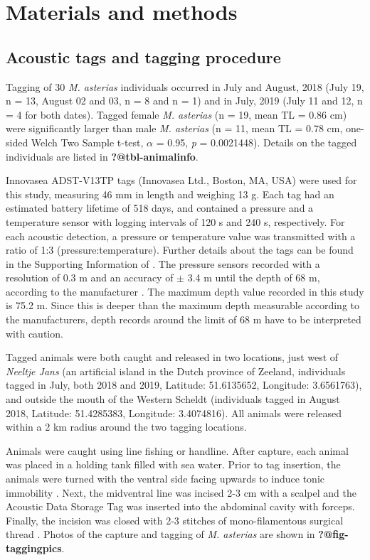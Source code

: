 \documentclass[
  authoryear,
  review,
  3p]{elsarticle}
\begin{document}
\hypertarget{sec-mm}{%
\section{Materials and methods}\label{sec-mm}}

\hypertarget{acoustic-tags-and-tagging-procedure}{%
\subsection{Acoustic tags and tagging
procedure}\label{acoustic-tags-and-tagging-procedure}}

Tagging of 30 \emph{M. asterias} individuals occurred in July and
August, 2018 (July 19, n = 13, August 02 and 03, n = 8 and n = 1) and in
July, 2019 (July 11 and 12, n = 4 for both dates). Tagged female
\emph{M. asterias} (n = 19, mean TL = 0.86 cm) were significantly larger
than male \emph{M. asterias} (n = 11, mean TL = 0.78 cm, one-sided Welch
Two Sample t-test, \(\alpha\) = 0.95, \emph{p} = 0.0021448). Details on
the tagged individuals are listed in \textbf{?@tbl-animalinfo}.

Innovasea ADST-V13TP tags (Innovasea Ltd., Boston, MA, USA) were used
for this study, measuring 46 mm in length and weighing 13 g. Each tag
had an estimated battery lifetime of 518 days, and contained a pressure
and a temperature sensor with logging intervals of 120 s and 240 s,
respectively. For each acoustic detection, a pressure or temperature
value was transmitted with a ratio of 1:3 (pressure:temperature).
Further details about the tags can be found in the Supporting
Information of \citet{goossens_2023}. The pressure sensors recorded with
a resolution of 0.3 m and an accuracy of \(\pm\) 3.4 m until the depth
of 68 m, according to the manufacturer \citep{Innovasea_ADST}. The
maximum depth value recorded in this study is 75.2 m. Since this is
deeper than the maximum depth measurable according to the manufacturers,
depth records around the limit of 68 m have to be interpreted with
caution.

Tagged animals were both caught and released in two locations, just west
of \emph{Neeltje Jans} (an artificial island in the Dutch province of
Zeeland, individuals tagged in July, both 2018 and 2019, Latitude:
51.6135652, Longitude: 3.6561763), and outside the mouth of the Western
Scheldt (individuals tagged in August 2018, Latitude: 51.4285383,
Longitude: 3.4074816). All animals were released within a 2 km radius
around the two tagging locations.

Animals were caught using line fishing or handline. After capture, each
animal was placed in a holding tank filled with sea water. Prior to tag
insertion, the animals were turned with the ventral side facing upwards
to induce tonic immobility \citep{kessel_2015}. Next, the midventral
line was incised 2-3 cm with a scalpel and the Acoustic Data Storage Tag
was inserted into the abdominal cavity with forceps. Finally, the
incision was closed with 2-3 stitches of mono-filamentous surgical
thread \citep{goossens_2023}. Photos of the capture and tagging of
\emph{M. asterias} are shown in \textbf{?@fig-taggingpics}.
\end{document}
